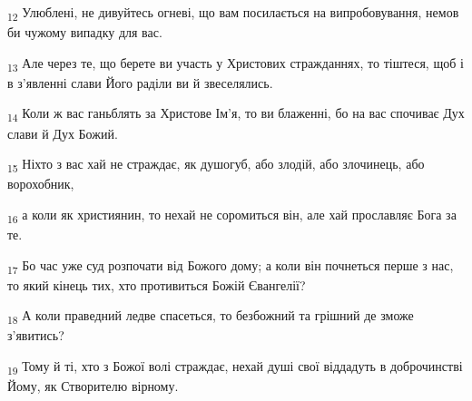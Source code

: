 \begin{tcolorbox}
\textsubscript{12} Улюблені, не дивуйтесь огневі, що вам посилається на випробовування, немов би чужому випадку для вас.
\end{tcolorbox}
\begin{tcolorbox}
\textsubscript{13} Але через те, що берете ви участь у Христових стражданнях, то тіштеся, щоб і в з'явленні слави Його раділи ви й звеселялись.
\end{tcolorbox}
\begin{tcolorbox}
\textsubscript{14} Коли ж вас ганьблять за Христове Ім'я, то ви блаженні, бо на вас спочиває Дух слави й Дух Божий.
\end{tcolorbox}
\begin{tcolorbox}
\textsubscript{15} Ніхто з вас хай не страждає, як душогуб, або злодій, або злочинець, або ворохобник,
\end{tcolorbox}
\begin{tcolorbox}
\textsubscript{16} а коли як християнин, то нехай не соромиться він, але хай прославляє Бога за те.
\end{tcolorbox}
\begin{tcolorbox}
\textsubscript{17} Бо час уже суд розпочати від Божого дому; а коли він почнеться перше з нас, то який кінець тих, хто противиться Божій Євангелії?
\end{tcolorbox}
\begin{tcolorbox}
\textsubscript{18} А коли праведний ледве спасеться, то безбожний та грішний де зможе з'явитись?
\end{tcolorbox}
\begin{tcolorbox}
\textsubscript{19} Тому й ті, хто з Божої волі страждає, нехай душі свої віддадуть в доброчинстві Йому, як Створителю вірному.
\end{tcolorbox}
